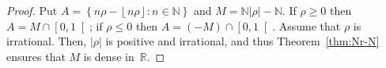 \documentclass[12pt]{article}
\newcommand{\bZ}{\mathbb{Z}}
\newcommand{\bN}{\mathbb{N}} %
\newcommand{\bR}{\mathbb{R}}
\newcommand{\floor}[1]{\left\lfloor #1  \right\rfloor}
\newcommand{\abs}[1]{\left| #1 \right|}
\theoremstyle{definition}
\begin{document}
 \begin{proof}
   Put
   $A = \left\{ n \rho - \floor{n \rho} : n \in \bN \right\}$ and $M = \bN \abs{ \rho } - \bN$.
   If $\rho \ge 0$ then $A = M \cap \left[0, 1 \right[$;
   if $\rho \le 0$ then $A = (- M) \cap \left[0, 1 \right[$.
   Assume that $\rho$ is irrational.
   Then, $\abs{\rho}$ is positive and irrational, and thus Theorem~\ref{thm:Nr-N} ensures that $M$ is dense in~$\bR$.
   
   
   
  \end{proof}
 

 



\end{document}
